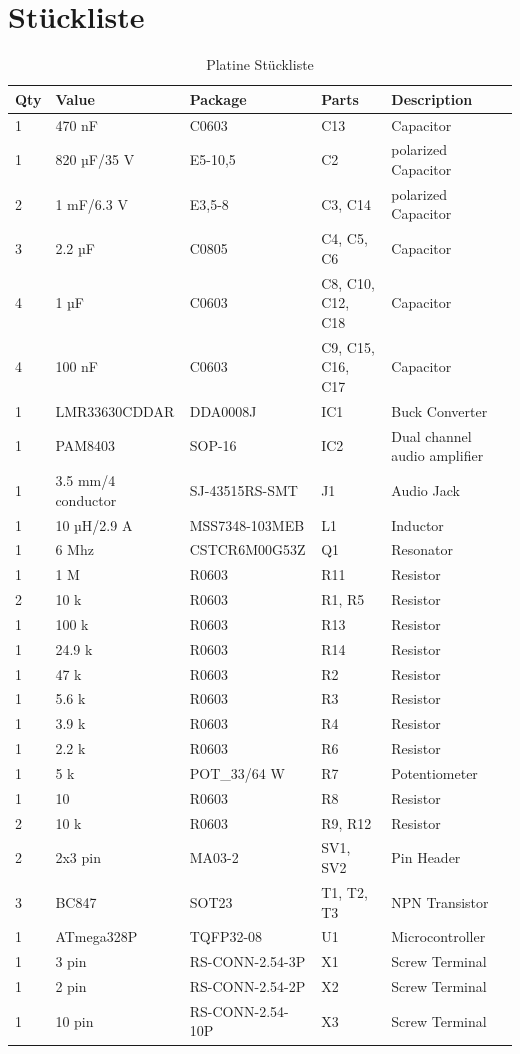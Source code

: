 \section{Stückliste}
{
	\footnotesize
	\begin{longtable}{lllll}
		\bottomrule\endfoot
		\bottomrule\caption{Platine Stückliste}\endlastfoot
		\toprule
		\textbf{Qty} & \textbf{Value} & \textbf{Package} & \textbf{Parts} & \textbf{Description} \\ 
		\midrule\endhead
		1 & 470 nF & C0603 & C13 & Capacitor \\
		1 & 820 µF/35 V & E5-10,5 & C2 & polarized Capacitor \\
		2 & 1 mF/6.3 V & E3,5-8 & C3, C14 & polarized Capacitor \\
		3 & 2.2 µF & C0805 & C4, C5, C6 & Capacitor \\
		4 & 1 µF & C0603 & C8, C10, C12, C18 & Capacitor \\
		4 & 100 nF & C0603 & C9, C15, C16, C17 & Capacitor \\
		1 & LMR33630CDDAR & DDA0008J & IC1 & Buck Converter \\
		1 & PAM8403 & SOP-16 & IC2 & Dual channel audio amplifier \\
		1 & 3.5 mm/4 conductor & SJ-43515RS-SMT & J1 & Audio Jack \\
		1 & 10 µH/2.9 A & MSS7348-103MEB & L1 & Inductor \\
		1 & 6 Mhz & CSTCR6M00G53Z & Q1 & Resonator \\
		1 & 1 M\tOmega & R0603 & R11 & Resistor \\
		2 & 10 k\tOmega & R0603 & R1, R5 & Resistor \\
		1 & 100 k\tOmega & R0603 & R13 & Resistor \\
		1 & 24.9 k\tOmega & R0603 & R14 & Resistor \\
		1 & 47 k\tOmega & R0603 & R2 & Resistor \\
		1 & 5.6 k\tOmega & R0603 & R3 & Resistor \\
		1 & 3.9 k\tOmega & R0603 & R4 & Resistor \\
		1 & 2.2 k\tOmega & R0603 & R6 & Resistor \\
		1 & 5 k\tOmega & POT\_33/64 W & R7 & Potentiometer \\
		1 & 10\tOmega & R0603 & R8 & Resistor \\
		2 & 10 k\tOmega & R0603 & R9, R12 & Resistor \\
		2 & 2x3 pin & MA03-2 & SV1, SV2 & Pin Header \\
		3 & BC847 & SOT23 & T1, T2, T3 & NPN Transistor \\
		1 & ATmega328P & TQFP32-08 & U1 & Microcontroller \\
		1 & 3 pin & RS-CONN-2.54-3P & X1 & Screw Terminal \\
		1 & 2 pin & RS-CONN-2.54-2P & X2 & Screw Terminal \\
		1 & 10 pin & RS-CONN-2.54-10P & X3 & Screw Terminal \\
	\end{longtable}
}